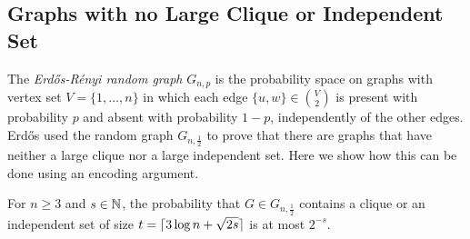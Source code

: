 \documentclass{patmorin}
\begin{document}
\subsection{Graphs with no Large Clique or Independent Set}

The \emph{Erd\H{o}s-R\'enyi random graph} $G_{n,p}$ is the
probability space on
graphs with vertex set $V=\{1,\ldots,n\}$ in which each edge $\{u,
w\} \in \binom{V}{2}$ is present with probability $p$ and absent with
probability $1-p$, independently of the other edges.  Erd\H{o}s
\cite{erdos:some} used the random graph $G_{n,\frac{1}{2}}$ to prove
that there are graphs that have neither a large clique nor a large 
independent set. Here we show how this can be done using an encoding
argument.

\begin{thm}
  For $n \ge 3$ and $s \in \mathbb{N}$, the probability that $G \in G_{n,\frac{1}{2}}$
  contains a clique or an independent set of size $t = {\lceil 3\log n +
    \sqrt{2s} \rceil}$ is at most $2^{-s}$.
\end{thm}
\end{document}
